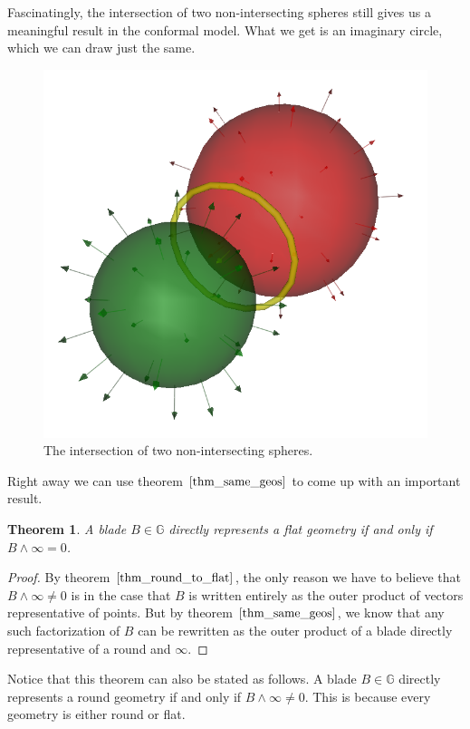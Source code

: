 \documentclass[12pt]{article}
\newcommand{\G}{\mathbb{G}}
\newcommand{\nvai}{\infty}
\newtheorem{theorem}{Theorem}[section]
\begin{document}
Fascinatingly, the intersection of two non-intersecting spheres still gives us a
meaningful result in the conformal model.  What we get is an imaginary circle,
which we can draw just the same.
\begin{figure}[H]
\centering
\includegraphics[scale=0.3]{ImaginaryIntersectionOfTwoSpheresFigure}
\caption{The intersection of two non-intersecting spheres.}
\end{figure}

Right away we can use theorem $\eqref{thm_same_geos}$ to come up with an important result.
\begin{theorem}\label{thm_flat_xor_round}
A blade $B\in\G$ directly represents a flat geometry if and only if
$B\wedge\nvai=0$.
\end{theorem}
\begin{proof}
By theorem $\eqref{thm_round_to_flat}$, the only reason we have to believe that $B\wedge\nvai\neq 0$
is in the case that $B$ is written entirely as the outer product of vectors representative of points.  But by theorem
$\eqref{thm_same_geos}$, we know that any such factorization of $B$ can
be rewritten as the outer product of a blade directly representative of a round
and $\nvai$.
\end{proof}
Notice that this theorem can also be stated as follows.  A blade $B\in\G$
directly represents a round geometry if and only if $B\wedge\nvai\neq 0$.
This is because every geometry is either round or flat.
\end{document}
